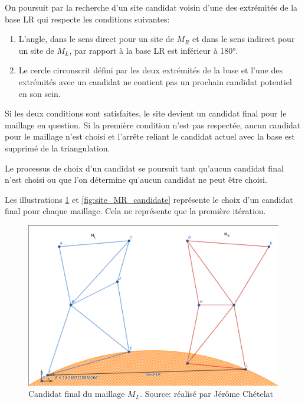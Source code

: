 On poursuit par la recherche d'un site candidat voisin d'une des extrémités de la base LR qui respecte les conditions suivantes:

\begin{enumerate}
    \item L'angle, dans le sens direct pour un site de $M_R$ et dans le sens indirect pour un site de $M_L$, par rapport à la base LR est inférieur à 180°.
    \item Le cercle circonscrit défini par les deux extrémités de la base et l'une des extrémités avec un candidat ne contient pas un prochain candidat potentiel en son sein.
\end{enumerate}

Si les deux conditions sont satisfaites, le site devient un candidat final pour le maillage en question.
Si la première condition n'est pas respectée, aucun candidat pour le maillage n'est choisi et l'arrête reliant le candidat actuel avec la base est supprimé de la triangulation.

Le processus de choix d'un candidat se poursuit tant qu'aucun candidat final n'est choisi ou que l'on détermine qu'aucun candidat ne peut être choisi.

Les illustrations \ref{fig:site_ML_candidate} et \ref{fig:site_MR_candidate} représente le choix d'un candidat final pour chaque maillage. Cela ne représente que la première itération.
\begin{figure}[htbp!]
    \centering
    \includegraphics[width=0.8\linewidth]{figures/site_ML.png}
    \caption{Candidat final du maillage $M_L$. Source: réalisé par Jérôme Chételat}
    \label{fig:site_ML_candidate}
\end{figure}

